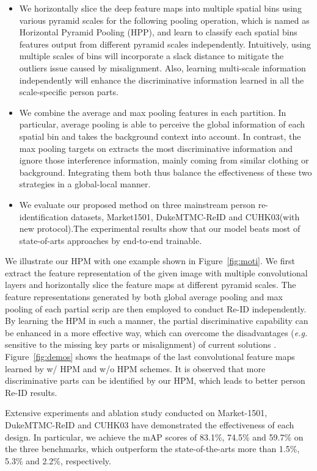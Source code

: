 \documentclass[letterpaper]{article} \usepackage{aaai19}  \usepackage{times}  \usepackage{helvet}  \usepackage{courier}  \usepackage{url}  \usepackage{graphicx}  \frenchspacing  \setlength{\pdfpagewidth}{8.5in}  \setlength{\pdfpageheight}{11in}  \usepackage{multirow}
\newcommand{\eg}{\emph{e.g. }}
\begin{document}
\begin{itemize}
\item We horizontally slice the deep feature maps into multiple spatial bins using various pyramid scales for the following pooling operation, which is named as Horizontal Pyramid Pooling (HPP), and learn to classify each spatial bins features output from different pyramid scales independently. Intuitively, using multiple scales of bins will incorporate a slack distance to mitigate the outliers issue caused by misalignment. Also, learning multi-scale information independently will enhance the discriminative information learned in all the scale-specific person parts.

\item We combine the average and max pooling features in each partition. In particular, average pooling is able to perceive the global information of each spatial bin and takes the background context into account. In contrast, the max pooling targets on extracts the most discriminative information and ignore those interference information, mainly coming from similar clothing or background. Integrating them both thus balance the effectiveness of these two strategies in a global-local manner.

\item We evaluate our proposed method on three mainstream person re-identification datasets, Market1501, DukeMTMC-ReID and CUHK03(with new protocol).The experimental results show that our model
beats most of state-of-arts approaches by end-to-end trainable.
\end{itemize}

We illustrate our HPM with one example shown in Figure~\ref{fig:moti}. We first extract the feature representation of the given image with multiple convolutional layers and horizontally slice the feature maps at different pyramid scales. The feature representations generated by both global average pooling and max pooling of each partial scrip are then employed to conduct Re-ID independently. By learning the HPM in such a manner, the partial discriminative capability can be enhanced in a more effective way, which can overcome the disadvantages (\eg sensitive to the missing key parts or misalignment) of current solutions . Figure~\ref{fig:demos} shows the heatmaps of the last convolutional feature maps learned by w/ HPM and w/o HPM schemes. It is observed that more discriminative parts can be identified by our HPM, which leads to better person Re-ID results. 

Extensive experiments and ablation study conducted on Market-1501, DukeMTMC-ReID and CUHK03 have demonstrated the effectiveness of each design. In particular, we achieve the mAP scores of 83.1\%, 74.5\% and 59.7\% on the three benchmarks, which outperform the state-of-the-arts more than 1.5\%, 5.3\% and 2.2\%, respectively.
\end{document}
